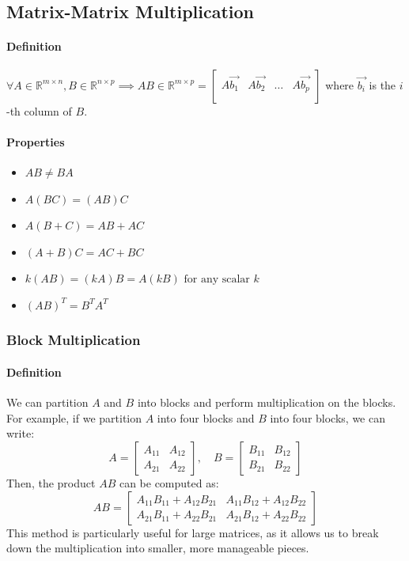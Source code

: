 \subsection{Matrix-Matrix Multiplication}
\hrulefill

\paragraph*{Definition}
$\forall A \in \mathbb{R}^{m \times n}, B \in \mathbb{R}^{n\times p} \implies AB \in \mathbb{R}^{m \times p} = \begin{bmatrix}
    A\vec{b_1} & A\vec{b_2} & \ldots & A\vec{b_p} \\
\end{bmatrix}$ where $\vec{b_i}$ is the $i$-th column of $B$.

\paragraph*{Properties}
\begin{itemize}
    \item $AB \neq BA$
    \item $A(BC) = (AB)C$
    \item $A(B+C) = AB + AC$
    \item $(A+B)C = AC + BC$
    \item $k(AB) = (kA)B = A(kB) \text{ for any scalar } k$
    \item $(AB)^T = B^T A^T$
\end{itemize}

\subsubsection*{Block Multiplication}
\paragraph*{Definition}
We can partition $A$ and $B$ into blocks and perform multiplication on the blocks. For example, if we partition $A$ into four blocks and $B$ into four blocks, we can write:
\[A = \begin{bmatrix}
    A_{11} & A_{12} \\
    A_{21} & A_{22}
\end{bmatrix}, \quad B = \begin{bmatrix}
    B_{11} & B_{12} \\
    B_{21} & B_{22}
\end{bmatrix}\]
Then, the product $AB$ can be computed as:
\[AB = \begin{bmatrix}
    A_{11}B_{11} + A_{12}B_{21} & A_{11}B_{12} + A_{12}B_{22} \\
    A_{21}B_{11} + A_{22}B_{21} & A_{21}B_{12} + A_{22}B_{22}
\end{bmatrix}\]
This method is particularly useful for large matrices, as it allows us to break down the multiplication into smaller, more manageable pieces.

